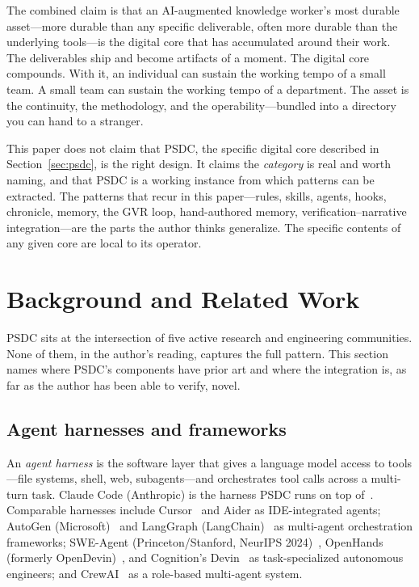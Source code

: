 \documentclass[12pt]{article}
\begin{document}
The combined claim is that an AI-augmented knowledge worker's most durable asset---more durable than any specific deliverable, often more durable than the underlying tools---is the digital core that has accumulated around their work. The deliverables ship and become artifacts of a moment. The digital core compounds. With it, an individual can sustain the working tempo of a small team. A small team can sustain the working tempo of a department. The asset is the continuity, the methodology, and the operability---bundled into a directory you can hand to a stranger.

This paper does not claim that PSDC, the specific digital core described in Section~\ref{sec:psdc}, is the right design. It claims the \emph{category} is real and worth naming, and that PSDC is a working instance from which patterns can be extracted. The patterns that recur in this paper---rules, skills, agents, hooks, chronicle, memory, the GVR loop, hand-authored memory, verification--narrative integration---are the parts the author thinks generalize. The specific contents of any given core are local to its operator.

\section{Background and Related Work}
\label{sec:related}

PSDC sits at the intersection of five active research and engineering communities. None of them, in the author's reading, captures the full pattern. This section names where PSDC's components have prior art and where the integration is, as far as the author has been able to verify, novel.

\subsection{Agent harnesses and frameworks}

An \emph{agent harness} is the software layer that gives a language model access to tools---file systems, shell, web, subagents---and orchestrates tool calls across a multi-turn task. Claude Code (Anthropic) is the harness PSDC runs on top of~\cite{claudecode}. Comparable harnesses include Cursor~\cite{cursor} and Aider as IDE-integrated agents; AutoGen (Microsoft)~\cite{autogen} and LangGraph (LangChain)~\cite{langgraph} as multi-agent orchestration frameworks; SWE-Agent (Princeton/Stanford, NeurIPS 2024)~\cite{swe-agent}, OpenHands (formerly OpenDevin)~\cite{openhands}, and Cognition's Devin~\cite{devin} as task-specialized autonomous engineers; and CrewAI~\cite{crewai} as a role-based multi-agent system.
\end{document}
